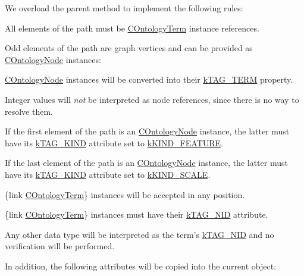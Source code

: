 We overload the parent method to implement the following rules\-:


\begin{DoxyItemize}
\item All elements of the path must be \hyperlink{class_c_ontology_term}{C\-Ontology\-Term} instance references. 
\item Odd elements of the path are graph vertices and can be provided as \hyperlink{class_c_ontology_node}{C\-Ontology\-Node} instances\-: 
\begin{DoxyItemize}
\item \hyperlink{class_c_ontology_node}{C\-Ontology\-Node} instances will be converted into their \hyperlink{}{k\-T\-A\-G\-\_\-\-T\-E\-R\-M} property. 
\item {\ttfamily Integer} values will {\itshape not} be interpreted as node references, since there is no way to resolve them. 
\item If the first element of the path is an \hyperlink{class_c_ontology_node}{C\-Ontology\-Node} instance, the latter must have its \hyperlink{}{k\-T\-A\-G\-\_\-\-K\-I\-N\-D} attribute set to \hyperlink{}{k\-K\-I\-N\-D\-\_\-\-F\-E\-A\-T\-U\-R\-E}. 
\item If the last element of the path is an \hyperlink{class_c_ontology_node}{C\-Ontology\-Node} instance, the latter must have its \hyperlink{}{k\-T\-A\-G\-\_\-\-K\-I\-N\-D} attribute set to \hyperlink{}{k\-K\-I\-N\-D\-\_\-\-S\-C\-A\-L\-E}. 
\end{DoxyItemize}
\item \{link \hyperlink{class_c_ontology_term}{C\-Ontology\-Term}\} instances will be accepted in any position. 
\item \{link \hyperlink{class_c_ontology_term}{C\-Ontology\-Term}\} instances must have their \hyperlink{}{k\-T\-A\-G\-\_\-\-N\-I\-D} attribute. 
\item Any other data type will be interpreted as the term's \hyperlink{}{k\-T\-A\-G\-\_\-\-N\-I\-D} and no verification will be performed. 
\end{DoxyItemize}

In addition, the following attributes will be copied into the current object\-:



